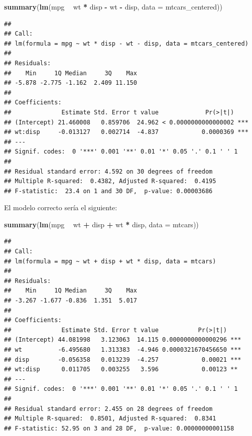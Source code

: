 \documentclass[
  12pt,
]{book}
\newenvironment{Shaded}{\begin{snugshade}}{\end{snugshade}}
\newcommand{\DataTypeTok}[1]{\textcolor[rgb]{0.13,0.29,0.53}{#1}}
\newcommand{\KeywordTok}[1]{\textcolor[rgb]{0.13,0.29,0.53}{\textbf{#1}}}
\newcommand{\NormalTok}[1]{#1}
\newcommand{\OperatorTok}[1]{\textcolor[rgb]{0.81,0.36,0.00}{\textbf{#1}}}
\newcommand{\StringTok}[1]{\textcolor[rgb]{0.31,0.60,0.02}{#1}}
\theoremstyle{definition}
\theoremstyle{definition}
\theoremstyle{definition}
\theoremstyle{remark}
\begin{document}
\begin{Shaded}
\begin{Highlighting}[]
\KeywordTok{summary}\NormalTok{(}\KeywordTok{lm}\NormalTok{(mpg }\OperatorTok{~}\StringTok{ }\NormalTok{wt }\OperatorTok{*}\StringTok{ }\NormalTok{disp }\OperatorTok{-}\StringTok{ }\NormalTok{wt }\OperatorTok{-}\StringTok{ }\NormalTok{disp, }\DataTypeTok{data =}\NormalTok{ mtcars_centered))}
\end{Highlighting}
\end{Shaded}

\begin{verbatim}
## 
## Call:
## lm(formula = mpg ~ wt * disp - wt - disp, data = mtcars_centered)
## 
## Residuals:
##    Min     1Q Median     3Q    Max 
## -5.878 -2.775 -1.162  2.409 11.150 
## 
## Coefficients:
##              Estimate Std. Error t value             Pr(>|t|)    
## (Intercept) 21.460008   0.859706  24.962 < 0.0000000000000002 ***
## wt:disp     -0.013127   0.002714  -4.837            0.0000369 ***
## ---
## Signif. codes:  0 '***' 0.001 '**' 0.01 '*' 0.05 '.' 0.1 ' ' 1
## 
## Residual standard error: 4.592 on 30 degrees of freedom
## Multiple R-squared:  0.4382, Adjusted R-squared:  0.4195 
## F-statistic:  23.4 on 1 and 30 DF,  p-value: 0.00003686
\end{verbatim}

El modelo correcto sería el siguiente:

\begin{Shaded}
\begin{Highlighting}[]
\KeywordTok{summary}\NormalTok{(}\KeywordTok{lm}\NormalTok{(mpg }\OperatorTok{~}\StringTok{ }\NormalTok{wt }\OperatorTok{+}\StringTok{ }\NormalTok{disp }\OperatorTok{+}\StringTok{ }\NormalTok{wt }\OperatorTok{*}\StringTok{ }\NormalTok{disp, }\DataTypeTok{data =}\NormalTok{ mtcars))}
\end{Highlighting}
\end{Shaded}

\begin{verbatim}
## 
## Call:
## lm(formula = mpg ~ wt + disp + wt * disp, data = mtcars)
## 
## Residuals:
##    Min     1Q Median     3Q    Max 
## -3.267 -1.677 -0.836  1.351  5.017 
## 
## Coefficients:
##              Estimate Std. Error t value           Pr(>|t|)    
## (Intercept) 44.081998   3.123063  14.115 0.0000000000000296 ***
## wt          -6.495680   1.313383  -4.946 0.0000321670456650 ***
## disp        -0.056358   0.013239  -4.257            0.00021 ***
## wt:disp      0.011705   0.003255   3.596            0.00123 ** 
## ---
## Signif. codes:  0 '***' 0.001 '**' 0.01 '*' 0.05 '.' 0.1 ' ' 1
## 
## Residual standard error: 2.455 on 28 degrees of freedom
## Multiple R-squared:  0.8501, Adjusted R-squared:  0.8341 
## F-statistic: 52.95 on 3 and 28 DF,  p-value: 0.00000000001158
\end{verbatim}
\end{document}
